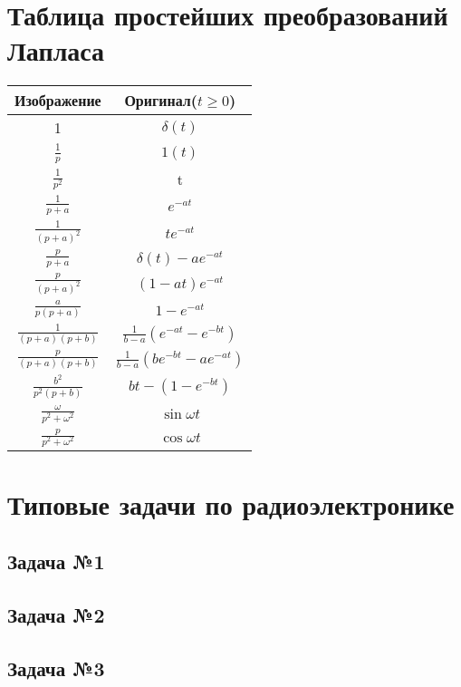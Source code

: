 \documentclass[a4paper,14pt]{extarticle}
\theoremstyle{definition}
\begin{document}


% 


\section{Таблица простейших преобразований Лапласа}
\begin{center}
\begin{tabular}{| c | c |}
	\hline
	Изображение                   & Оригинал($t\geq0$)              \\ \hline
	1			                  & $\delta(t)$                     \\ \hline
	$\frac1p$	                  & $1(t)$                          \\ \hline
	$\frac{1}{p^2}$               & t                               \\ \hline
	$\frac{1}{p+a}$               & $e^{-at}$                       \\ \hline
	$\frac{1}{(p+a)^2}$           & $te^{-at}$                      \\ \hline
	$\frac{p}{p+a}$               & $\delta(t)-ae^{-at}$            \\ \hline
	$\frac{p}{(p+a)^2}$           & $(1-at) e^{-at}$                \\ \hline
	$\frac{a}{p(p+a)}$            & $1-e^{-at}$                     \\ \hline
	$\frac{1}{(p+a)(p+b)}$ & $\frac{1}{b-a} (e^{-at} -e^{-bt} ) $   \\ \hline
	$\frac{p}{(p+a)(p+b)}$ & $\frac{1}{b-a} (be^{-bt} -ae^{-at} ) $ \\ \hline
	$\frac{b^2}{p^2(p+b)}$        & $bt-(1-e^{-bt})$                \\ \hline
	$\frac{\omega}{p^2+\omega^2}$ & $\sin{\omega t}$                \\ \hline
	$\frac{p}{p^2+\omega^2}$      & $\cos{\omega t}$ 	            \\ \hline
\end{tabular}
\end{center}
\section{Типовые задачи по радиоэлектронике}

\subsection{Задача №1}



\subsection{Задача №2}



\subsection{Задача №3}

\end{document}
